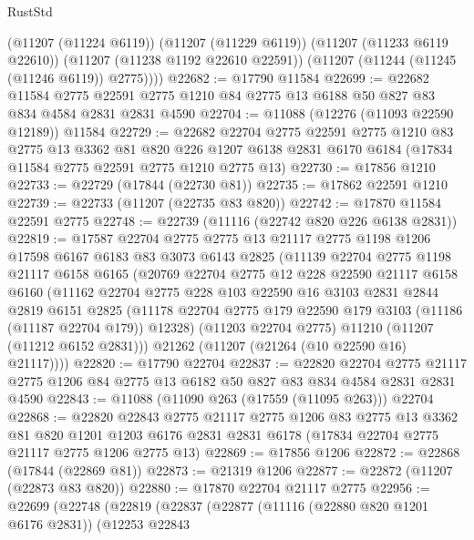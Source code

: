 \begin{lexlean}{RustStd}
\begin{coremodule}
        (@11207 (@11224 @6119))
        (@11207 (@11229 @6119))
        (@11207 (@11233 @6119 @22610))
        (@11207 (@11238 @1192 @22610 @22591))
        (@11207 (@11244 (@11245 (@11246 @6119)) @2775))))
@22682 := @17790 @11584
@22699 := @22682
    @11584
    @2775
    @22591
    @2775
    @1210
    @84
    @2775
    @13
    @6188
    @50
    @827
    @83
    @834
    @4584
    @2831
    @2831
    @4590
@22704 := @11088 (@12276 (@11093 @22590 @12189)) @11584
@22729 := @22682
    @22704
    @2775
    @22591
    @2775
    @1210
    @83
    @2775
    @13
    @3362
    @81
    @820
    @226
    @1207
    @6138
    @2831
    @6170
    @6184
    (@17834 @11584 @2775 @22591 @2775 @1210 @2775 @13)
@22730 := @17856 @1210
@22733 := @22729 (@17844 (@22730 @81))
@22735 := @17862 @22591 @1210
@22739 := @22733 (@11207 (@22735 @83 @820))
@22742 := @17870 @11584 @22591 @2775
@22748 := @22739 (@11116 (@22742 @820 @226 @6138 @2831))
@22819 := @17587
    @22704
    @2775
    @2775
    @13
    @21117
    @2775
    @1198
    @1206
    @17598
    @6167
    @6183
    @83
    @3073
    @6143
    @2825
    (@11139
      @22704
      @2775
      @1198
      @21117
      @6158
      @6165
      (@20769
        @22704
        @2775
        @12
        @228
        @22590
        @21117
        @6158
        @6160
        (@11162
          @22704
          @2775
          @228
          @103
          @22590
          @16
          @3103
          @2831
          @2844
          @2819
          @6151
          @2825
          (@11178 @22704 @2775 @179 @22590 @179 @3103 (@11186 (@11187 @22704 @179)) @12328)
          (@11203 @22704 @2775)
          @11210
          (@11207 (@11212 @6152 @2831)))
        @21262
        (@11207 (@21264 (@10 @22590 @16) @21117))))
@22820 := @17790 @22704
@22837 := @22820
    @22704
    @2775
    @21117
    @2775
    @1206
    @84
    @2775
    @13
    @6182
    @50
    @827
    @83
    @834
    @4584
    @2831
    @2831
    @4590
@22843 := @11088 (@11090 @263 (@17559 (@11095 @263))) @22704
@22868 := @22820
    @22843
    @2775
    @21117
    @2775
    @1206
    @83
    @2775
    @13
    @3362
    @81
    @820
    @1201
    @1203
    @6176
    @2831
    @2831
    @6178
    (@17834 @22704 @2775 @21117 @2775 @1206 @2775 @13)
@22869 := @17856 @1206
@22872 := @22868 (@17844 (@22869 @81))
@22873 := @21319 @1206
@22877 := @22872 (@11207 (@22873 @83 @820))
@22880 := @17870 @22704 @21117 @2775
@22956 := @22699
    (@22748
      (@22819
        (@22837
          (@22877
            (@11116 (@22880 @820 @1201 @6176 @2831))
            (@12253
              @22843

\end{coremodule}
\end{lexlean}
